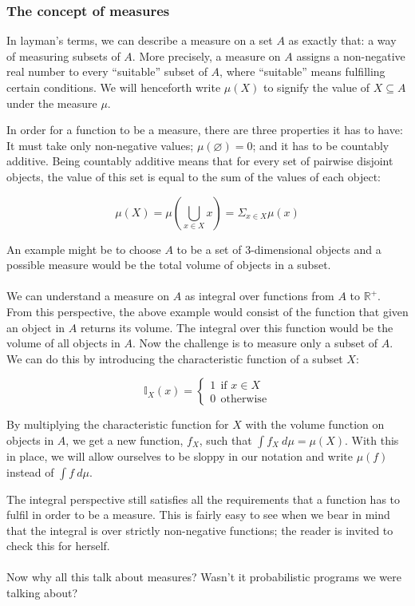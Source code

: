 \documentclass[11pt, leqno, titlepage]{article}
\theoremstyle{definition}
\begin{document}
\subsubsection{The concept of measures}
In layman's terms, we can describe a measure on a set $A$ as exactly that: a way of
measuring subsets of $A$. More precisely, a measure on $A$ assigns a non-negative
real number to every ``suitable'' subset of $A$, where ``suitable'' means fulfilling
certain conditions. We will henceforth write $\mu (X)$ to signify the value of $X
\subseteq A$ under the measure $\mu$.

In order for a function to be a measure, there are three properties it has to have:
It must take only non-negative values; $\mu (\varnothing) = 0$; and it has to be
countably additive. Being countably additive means that for every set of pairwise
disjoint objects, the value of this set is equal to the sum of the values of each
object:

\begin{equation*}
  \mu (X) = \mu(\bigcup_{x\in X} x) = \Sigma_{x\in X} \mu (x)
\end{equation*}

An example might be to choose $A$ to be a set of 3-dimensional objects and a possible
measure would be the total volume of objects in a subset. \\
\\
We can understand a measure on $A$ as integral
over functions from $A$ to $\mathbb{R}^+$. From this perspective, the above example
would consist of the function that given an object in $A$ returns its volume. The
integral over this function would be the volume of all objects in $A$. Now the
challenge is to measure only a subset of $A$. We can do this by introducing the
characteristic function of a subset $X$\cite{wiki-measure}:

$$\mathbb{I}_X(x)=
\begin{cases}
  1~~\text{if }x\in X\\
  0~~\text{otherwise}
\end{cases}$$

By multiplying the characteristic function for $X$ with the volume function on
objects in $A$, we get a new function, $f_X$, such that $\int f_X~d\mu =
\mu(X)$. With this in place, we will allow ourselves to be sloppy in our notation and
write $\mu(f)$ instead of $\int f~d\mu$.

The integral perspective still satisfies all the requirements that a function has to
fulfil in order to be a measure. This is fairly easy to see when we bear in mind that
the integral is over strictly non-negative functions; the reader is invited to check
this for herself.\\
\\
Now why all this talk about measures? Wasn't it probabilistic programs we were
talking about?
\end{document}
